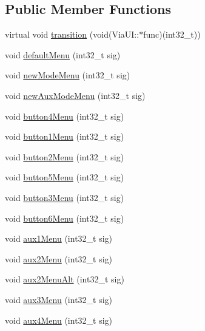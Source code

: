 \subsection*{Public Member Functions}
\begin{DoxyCompactItemize}
\item 
virtual void \mbox{\hyperlink{class_via_u_i_a99373a450c4c494a6261edbfc3b21fd9}{transition}} (void(Via\+U\+I\+::$\ast$func)(int32\+\_\+t))
\item 
void \mbox{\hyperlink{class_via_u_i_af80f2151bdd13bc6e84517064100ed92}{default\+Menu}} (int32\+\_\+t sig)
\item 
void \mbox{\hyperlink{class_via_u_i_ac0e9dd4f7b102c712e14d9ee062dcaf7}{new\+Mode\+Menu}} (int32\+\_\+t sig)
\item 
void \mbox{\hyperlink{class_via_u_i_a104b7dbb35cab9ac82b61f364052dc07}{new\+Aux\+Mode\+Menu}} (int32\+\_\+t sig)
\item 
void \mbox{\hyperlink{class_via_u_i_a4d97fe8dca5340f69e5b4441928e4364}{button4\+Menu}} (int32\+\_\+t sig)
\item 
void \mbox{\hyperlink{class_via_u_i_ae921a22294017c3a1aa3e670d30768a1}{button1\+Menu}} (int32\+\_\+t sig)
\item 
void \mbox{\hyperlink{class_via_u_i_a98cab09e693942478ce7136e3077276a}{button2\+Menu}} (int32\+\_\+t sig)
\item 
void \mbox{\hyperlink{class_via_u_i_a0d3e2a3c83ad6781e9e403062131d205}{button5\+Menu}} (int32\+\_\+t sig)
\item 
void \mbox{\hyperlink{class_via_u_i_a4c6811c74f2c1cfadd84be925ed905fc}{button3\+Menu}} (int32\+\_\+t sig)
\item 
void \mbox{\hyperlink{class_via_u_i_aed3d9b75b2d67b17a5596597aa59cf26}{button6\+Menu}} (int32\+\_\+t sig)
\item 
void \mbox{\hyperlink{class_via_u_i_aaee6701bf5a06d4064caa2443d96f61d}{aux1\+Menu}} (int32\+\_\+t sig)
\item 
void \mbox{\hyperlink{class_via_u_i_a928f20f199d42ce05487d5ed7bffd574}{aux2\+Menu}} (int32\+\_\+t sig)
\item 
void \mbox{\hyperlink{class_via_u_i_adf31f9ee348422bc4536f5fc1ef401a4}{aux2\+Menu\+Alt}} (int32\+\_\+t sig)
\item 
void \mbox{\hyperlink{class_via_u_i_adf0e11621a20477354eb1169c3943cb8}{aux3\+Menu}} (int32\+\_\+t sig)
\item 
void \mbox{\hyperlink{class_via_u_i_a9e082c0b454b4fe05a9fc48ca922f9b5}{aux4\+Menu}} (int32\+\_\+t sig)
\item 

\end{DoxyCompactItemize}
